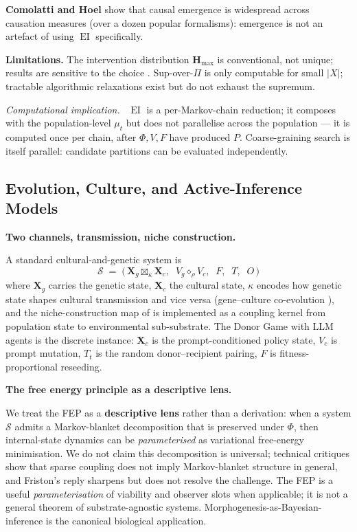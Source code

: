\documentclass[journal]{IEEEtran}
\theoremstyle{plain}
\theoremstyle{definition}
\theoremstyle{plain}
\newenvironment{implnote}[1][Computational implication]{%
  \par\smallskip\noindent\emph{#1.}\ }{\par\smallskip}
\newcounter{topic}[subsection]
\newcommand{\topic}[1]{%
  \refstepcounter{topic}%
  \par\smallskip\noindent\textbf{#1.}\ }
\DeclareMathOperator{\EI}{EI}
\newcommand{\Hmax}{\mathbf{H}_{\max}}
\newcommand{\X}{\mathbf{X}}
\begin{document}
\textbf{Comolatti and Hoel} \cite{comolatti2022causal} show that causal emergence is widespread
across causation measures (over a dozen popular formalisms): emergence is
not an artefact of using $\EI$ specifically.

\textbf{Limitations.} The intervention distribution $\Hmax$ is conventional,
not unique; results are sensitive to the choice \cite{dewhurst2021causal}. Sup-over-$\Pi$
is only computable for small $|X|$; tractable algorithmic relaxations exist
\cite{klein2020scales,griebenow2019scale} but do not exhaust the supremum.

\begin{implnote}
$\EI$ is a per-Markov-chain reduction; it composes with the population-level
$\mu_t$ but does not parallelise across the population --- it is computed
once per chain, after $\Phi,V,F$ have produced $P$. Coarse-graining search
is itself parallel: candidate partitions can be evaluated independently.
\end{implnote}

\subsection{Evolution, Culture, and Active-Inference Models}

\topic{Two channels, transmission, niche construction}

A standard cultural-and-genetic system is
\[
  \mathcal{S} \;=\; \big(\,\X_g \boxtimes_\kappa \X_c, \;\; V_g \diamond_\rho V_c, \;\; F, \;\; T, \;\; O\,\big)
\]
where $\X_g$ carries the genetic state, $\X_c$ the cultural state, $\kappa$
encodes how genetic state shapes cultural transmission and vice versa
(gene--culture co-evolution \cite{boyd1985culture}), and the
niche-construction map of \cite{odlingsmee2003niche} is
implemented as a coupling kernel from population state to environmental
sub-substrate. The Donor Game with LLM agents \cite{vallinder2024cultural} is
the discrete instance: $\X_c$ is the prompt-conditioned policy state, $V_c$
is prompt mutation, $T_t$ is the random donor--recipient pairing, $F$ is
fitness-proportional reseeding.

\topic{The free energy principle as a descriptive lens}\label{sec:fep}

We treat the FEP \cite{friston2013life,kirchhoff2018blankets} as a
\textbf{descriptive lens} rather than a derivation: when a system
$\mathcal{S}$ admits a Markov-blanket decomposition that is preserved under
$\Phi$, then internal-state dynamics can be \emph{parameterised} as
variational free-energy minimisation. We do not claim this decomposition is
universal; technical critiques \cite{aguilera2022particular,biehl2021critique}
show that sparse coupling
does not imply Markov-blanket structure in general, and Friston's reply
\cite{friston2022reply} sharpens but does not resolve the
challenge. The FEP is a useful \emph{parameterisation} of viability and
observer slots when applicable; it is not a general theorem of
substrate-agnostic systems. Morphogenesis-as-Bayesian-inference
\cite{kuchling2020morphogenesis} is the canonical biological application.
\end{document}
